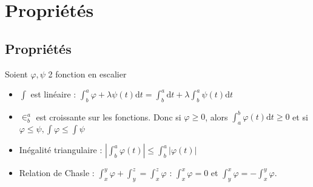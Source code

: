 \documentclass[french]{yLectureNote}
\begin{document}
%
%
%
%
%
%
\section{Propriétés}
\subsection{Propriétés}
Soient $\varphi,\psi$ 2 fonction en escalier

\begin{itemize}
 \item $\int$ est linéaire : $\int_b^a \varphi + \lambda \psi(t) \mathrm{d}t = \int_b^a \mathrm{d}t + \lambda \int_b^a \psi(t) \mathrm{d}t$
 \item $\in^a_b$ est croissante sur les fonctions. Donc si $\varphi \geq 0$, alors $\int^b_a\varphi(t)\mathrm{d}t \geq 0$ et si $\varphi \leq \psi, \int \varphi \leq \int \psi$
 \item Inégalité triangulaire : $|\int_b^a \varphi(t)| \leq \int^a_b |\varphi(t)|$
 \item Relation de Chasle : $\int^y_x\varphi + \int^z_y = \int^z_x\varphi$ : $\int^x_x \varphi = 0$ et $\int^x_y\varphi = -\int^y_x \varphi$.
\end{itemize}
\end{document}
